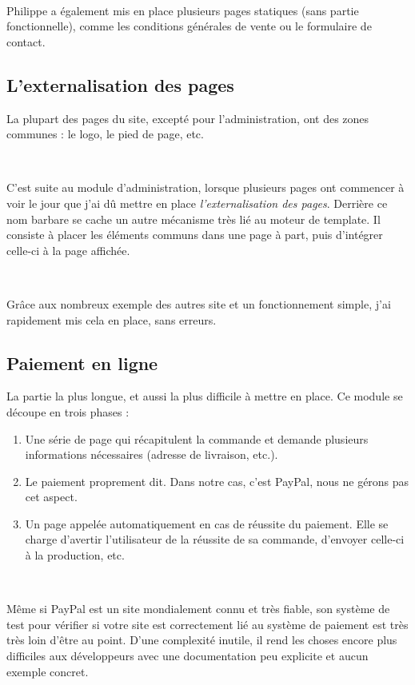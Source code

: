 ~

Philippe a également mis en place plusieurs pages statiques (sans partie fonctionnelle), comme les conditions générales de vente ou le formulaire de contact.

\subsection{L'externalisation des pages}
La plupart des pages du site, excepté pour l'administration, ont des zones communes : le logo, le pied de page, etc.

~

C'est suite au module d'administration, lorsque plusieurs pages ont commencer à voir le jour que j'ai dû mettre en place \emph{l'externalisation des pages}. Derrière ce nom barbare se cache un autre mécanisme très lié au moteur de template. Il consiste à placer les éléments communs dans une page à part, puis d'intégrer celle-ci à la page affichée.

~

Grâce aux nombreux exemple des autres site et un fonctionnement simple, j'ai rapidement mis cela en place, sans erreurs.

\subsection{Paiement en ligne}
La partie la plus longue, et aussi la plus difficile à mettre en place. Ce module se découpe en trois phases :
\begin{enumerate}
	\item Une série de page qui récapitulent la commande et demande plusieurs informations nécessaires (adresse de livraison, etc.).
	\item Le paiement proprement dit. Dans notre cas, c'est PayPal, nous ne gérons pas cet aspect.
	\item Un page appelée automatiquement en cas de réussite du paiement. Elle se charge d'avertir l'utilisateur de la réussite de sa commande, d'envoyer celle-ci à la production, etc.
\end{enumerate}

~

Même si PayPal est un site mondialement connu et très fiable, son système de test pour vérifier si votre site est correctement lié au système de paiement est très très loin d'être au point. D'une complexité inutile, il rend les choses encore plus difficiles aux développeurs avec une documentation peu explicite et aucun exemple concret.

